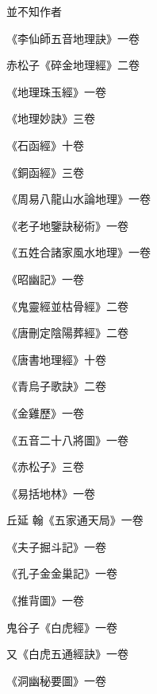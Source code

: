 \begin{pinyinscope}
 並不知作者



 《李仙師五音地理訣》一卷



 赤松子《碎金地理經》二卷



 《地理珠玉經》一卷



 《地理妙訣》三卷



 《石函經》十卷



 《銅函經》三卷



 《周易八龍山水論地理》一卷



 《老子地鑒訣秘術》一卷



 《五姓合諸家風水地理》一卷



 《昭幽記》一卷



 《鬼靈經並枯骨經》二卷



 《唐刪定陰陽葬經》二卷



 《唐書地理經》十卷



 《青烏子歌訣》二卷



 《金雞歷》一卷



 《五音二十八將圖》一卷



 《赤松子》三卷



 《易括地林》一卷



 丘延
 翰《五家通天局》一卷



 《夫子掘斗記》一卷



 《孔子金金巢記》一卷



 《推背圖》一卷



 鬼谷子《白虎經》一卷



 又《白虎五通經訣》一卷



 《洞幽秘要圖》一卷




\end{pinyinscope}
